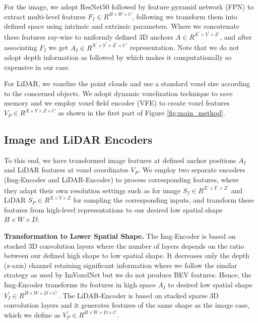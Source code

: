 \documentclass[10pt,twocolumn,letterpaper]{article}
\begin{document}
For the image, we adopt ResNet50 \cite{he2016deep} followed by feature pyramid network (FPN) \cite{lin2017feature} to extract multi-level features $F_I  \in R^{H \times W \times C}$, following \cite{rukhovich2022imvoxelnet, philion2020lift} we transform them into defined space using intrinsic and extrinsic parameters. Where we concatenate these features ray-wise to uniformly defined 3D anchors $A \in R^{X^\prime \times Y^\prime \times Z^\prime}$, and after associating $F_I$ we get $A_I \in R^{X^\prime \times Y^\prime \times Z^\prime \times C^\prime}$ representation. Note that we do not adopt depth information as followed by \cite{li2022unifying} which makes it computationally so expensive in our case. 

For LiDAR, we voxelize the point clouds and use a standard voxel size according to the concerned objects. We adopt dynamic voxelization \cite{zhou2019endtoend} technique to save memory and we employ voxel field encoder (VFE) \cite{zhou2018voxelnet} to create voxel features $V_P \in R^{X \times Y \times Z \times C}$ as shown in the first part of Figure \ref{fig:main_method}.


\subsection{Image and LiDAR Encoders}
To this end, we have transformed image features at defined anchor positions $A_I$ and LiDAR features at voxel coordinates  $V_P$. We employ two separate encoders (Img-Encoder and LiDAR-Encoder) to process corresponding features, where they adapt their own resolution settings such as for image $S_I \in R^{X^\prime\times Y^\prime\times Z^\prime}$ and LiDAR $S_P \in R^{X\times Y\times Z}$ for sampling the corresponding inputs, and transform these features from high-level representations to our desired low spatial shape ${H\times W\times D}$. 

\textbf{Transformation to Lower Spatial Shape.}
%
The Img-Encoder is based on stacked 3D convolution layers where the number of layers depends on the ratio between our defined high shape to low spatial shape. It decreases only the depth (z-axis) channel retaining significant information where we follow the similar strategy as used by ImVoxelNet \cite{rukhovich2022imvoxelnet} but we do not produce BEV features. Hence, the Img-Encoder transforms its features in high space $A_I$ to desired low spatial shape $V^\prime_I \in R^{H\times W\times D \times C^\prime}$.
%
The LiDAR-Encoder is based on stacked sparse 3D convolution layers and it generates features of the same shape as the image case, which we define as  $V^\prime_P \in R^{H\times W\times D \times C}$.
\end{document}
